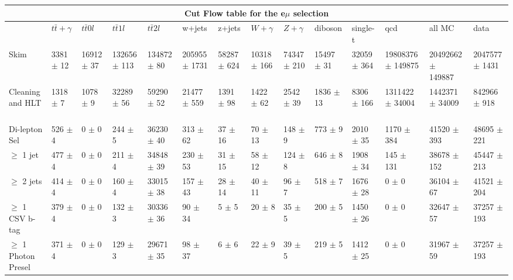 \begin{table}
  \centering
\resizebox{\columnwidth}{!} {

\begin{tabular}{|l|l|l|l|l|l|l|l|l|l|l|l|l|l|}
\hline
\multicolumn{14}{|c|}{\textbf{Cut Flow table for the e$\mu$ selection}} \\
\hline
 & $t\bar{t}+\gamma$ & $t\bar{t} 0l$ & $t\bar{t} 1l$ & $t\bar{t} 2l$ & w+jets & z+jets & $W+\gamma$ & $Z+\gamma$ & diboson & single-t & qcd & all MC & data \\
\hline 
Skim & 3381 $\pm$ 12 \ & 16912 $\pm$ 37 \ & 132656 $\pm$ 113 \ & 134872 $\pm$ 80 \ & 205955 $\pm$ 1731 \ & 58287 $\pm$ 624 \ & 10318 $\pm$ 166 \ & 74347 $\pm$ 210 \ & 15497 $\pm$ 31 \ & 32059 $\pm$ 364 \ & 19808376 $\pm$ 149875 \ & 20492662 $\pm$ 149887\ & 2047577 $\pm$ 1431 \\
Cleaning and HLT & 1318 $\pm$ 7 \ & 1078 $\pm$ 9 \ & 32289 $\pm$ 56 \ & 59290 $\pm$ 52 \ & 21477 $\pm$ 559 \ & 1391 $\pm$ 98 \ & 1422 $\pm$ 62 \ & 2542 $\pm$ 39 \ & 1836 $\pm$ 13 \ & 8306 $\pm$ 166 \ & 1311422 $\pm$ 34004 \ & 1442371 $\pm$ 34009\ & 842966 $\pm$ 918 \\
Di-lepton Sel & 526 $\pm$ 4 \ & 0 $\pm$ 0 \ & 244 $\pm$ 5 \ & 36230 $\pm$ 40 \ & 313 $\pm$ 62 \ & 37 $\pm$ 16 \ & 70 $\pm$ 13 \ & 148 $\pm$ 9 \ & 773 $\pm$ 9 \ & 2010 $\pm$ 35 \ & 1170 $\pm$ 384 \ & 41520 $\pm$ 393\ & 48695 $\pm$ 221 \\
$\geq$ 1 jet & 477 $\pm$ 4 \ & 0 $\pm$ 0 \ & 211 $\pm$ 4 \ & 34848 $\pm$ 39 \ & 230 $\pm$ 53 \ & 31 $\pm$ 15 \ & 58 $\pm$ 12 \ & 124 $\pm$ 8 \ & 646 $\pm$ 8 \ & 1908 $\pm$ 34 \ & 145 $\pm$ 131 \ & 38678 $\pm$ 152\ & 45447 $\pm$ 213 \\
$\geq$ 2 jets & 414 $\pm$ 4 \ & 0 $\pm$ 0 \ & 160 $\pm$ 4 \ & 33015 $\pm$ 38 \ & 157 $\pm$ 43 \ & 28 $\pm$ 14 \ & 40 $\pm$ 11 \ & 96 $\pm$ 7 \ & 518 $\pm$ 7 \ & 1676 $\pm$ 28 \ & 0 $\pm$ 0 \ & 36104 $\pm$ 67\ & 41521 $\pm$ 204 \\
$\geq$ 1 CSV b-tag & 379 $\pm$ 4 \ & 0 $\pm$ 0 \ & 132 $\pm$ 3 \ & 30336 $\pm$ 36 \ & 90 $\pm$ 34 \ & 5 $\pm$ 5 \ & 20 $\pm$ 8 \ & 35 $\pm$ 5 \ & 200 $\pm$ 5 \ & 1450 $\pm$ 26 \ & 0 $\pm$ 0 \ & 32647 $\pm$ 57\ & 37257 $\pm$ 193 \\
$\geq$ 1 Photon Presel & 371 $\pm$ 4 \ & 0 $\pm$ 0 \ & 129 $\pm$ 3 \ & 29671 $\pm$ 35 \ & 98 $\pm$ 37 \ & 6 $\pm$ 6 \ & 22 $\pm$ 9 \ & 39 $\pm$ 5 \ & 219 $\pm$ 5 \ & 1412 $\pm$ 25 \ & 0 $\pm$ 0 \ & 31967 $\pm$ 59\ & 37257 $\pm$ 193 \\

\end{tabular}}
\end{table}
